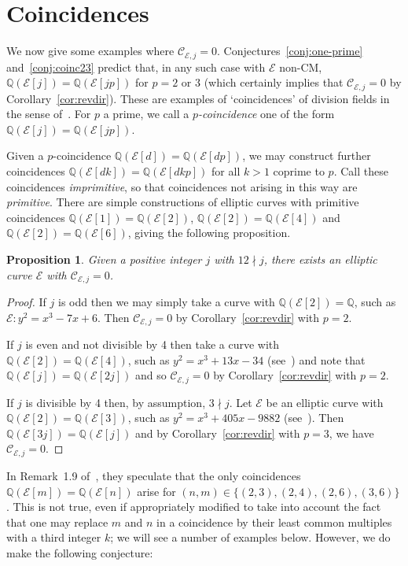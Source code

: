 \documentclass{amsart}
\theoremstyle{plain}
\newtheorem{prop}[theorem]{Proposition}
\theoremstyle{remark}
\newcommand{\Q}{\mathbb{Q}}
\newcommand{\E}{\mathcal{E}}
\newcommand{\Cc}{\mathcal{C}}
\begin{document}
\section{Coincidences}
\label{sec:coincidences}
We now give some examples where $\Cc_{\E,j} = 0$. Conjectures~\ref{conj:one-prime} and~\ref{conj:coinc23} predict that, in
any such case with $\E$ non-CM, $\Q(\E[j]) = \Q(\E[jp])$
for $p = 2$ or $3$ (which certainly implies that $\Cc_{\E,j} = 0$ by Corollary~\ref{cor:revdir}). These are examples of
`coincidences' of division fields in the sense of~\cite{DLZ}. For $p$ a prime, we call a \emph{$p$-coincidence} one of
the form $\Q(\E[j]) = \Q(\E[jp])$.

Given a $p$-coincidence $\Q(\E[d]) = \Q(\E[dp])$, we may construct further coincidences $\Q(\E[dk]) = \Q(\E[dkp])$ for all
$k > 1$ coprime to $p$. Call these coincidences \emph{imprimitive}, so that coincidences not arising in this way are
\emph{primitive}. There are simple constructions of elliptic curves with primitive coincidences
$\Q(\E[1]) = \Q(\E[2])$, $\Q(\E[2]) = \Q(\E[4])$ and $\Q(\E[2]) = \Q(\E[6])$, giving the following proposition.

\begin{prop}
    Given a positive integer $j$ with $12 \nmid j$, there exists an elliptic curve $\E$ with $\Cc_{\E,j}=0$.
\end{prop}
\begin{proof}
    If $j$ is odd then we may simply take a curve with $\Q(\E[2])=\Q$, such as $\E: y^2=x^3-7x+6$. Then $\Cc_{\E,j}=0$ by Corollary~\ref{cor:revdir} with $p=2$. 

    If $j$ is even and not divisible by 4 then take a curve with $\Q(\E[2]) = \Q(\E[4])$, such as $y^2 = x^3 + 13x - 34$ (see~\cite[Example~1.3]{DLZ}) and note that $\Q(\E[j]) = \Q(\E[2j])$ and so $\Cc_{\E,j} = 0$ by Corollary~\ref{cor:revdir} with $p=2$.
    
		    If $j$ is divisible by 4 then, by assumption, $3 \nmid j$. Let $\E$ be an elliptic curve with $\Q(\E[2])=\Q(\E[3])$, such as $y^2 = x^3 + 405x - 9882$ (see~\cite[Example~1.2]{DLZ}). %
	    Then $\Q(\E[3j])=\Q(\E[j])$ and by Corollary~\ref{cor:revdir} with $p=3$, we have $\Cc_{\E,j}=0$.
\end{proof}

In Remark~1.9 of~\cite{DLZ}, they speculate that the only coincidences $\Q(\E[m]) = \Q(\E[n])$
arise for $(n, m) \in \{(2, 3), (2, 4), (2, 6), (3, 6)\}$. This is not true, even if appropriately modified to take into
account the fact that one may replace $m$ and $n$ in a coincidence by their least common multiples with a third integer
$k$; we will see a number of examples below. However, we do make the following conjecture:
\end{document}
